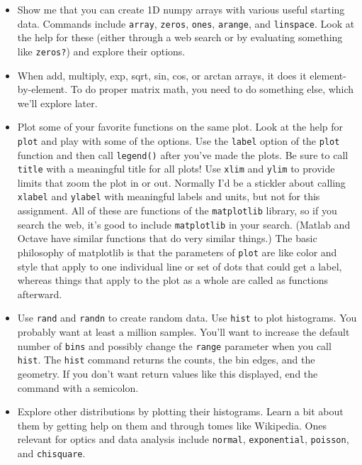 \documentclass[11pt]{hmcpset}
\begin{document}
\begin{problem}
	\begin{itemize}
		\item Show me that you can create 1D numpy arrays with various useful starting data. Commands include \texttt{array}, \texttt{zeros}, \texttt{ones}, \texttt{arange}, and \texttt{linspace}. Look at the help for these (either through a web search or by evaluating something like \texttt{zeros?}) and explore their options.
		\item When add, multiply, exp, sqrt, sin, cos, or arctan arrays, it does it element-by-element. To do proper matrix math, you need to do something else, which we'll explore later.
		\item Plot some of your favorite functions on the same plot. Look at the help for \texttt{plot} and play with some of the options. Use the \texttt{label} option of the \texttt{plot} function and then call \texttt{legend()} after you've made the plots. Be sure to call \texttt{title} with a meaningful title for all plots! Use \texttt{xlim} and \texttt{ylim} to provide limits that zoom the plot in or out. Normally I'd be a stickler about calling \texttt{xlabel} and \texttt{ylabel} with meaningful labels and units, but not for this assignment. All of these are functions of the \texttt{matplotlib} library, so if you search the web, it's good to include \texttt{matplotlib} in your search. (Matlab and Octave have similar functions that do very similar things.) The basic philosophy of matplotlib is that the parameters of \texttt{plot} are like color and style that apply to one individual line or set of dots that could get a label, whereas things that apply to the plot as a whole are called as functions afterward.
		\item Use \texttt{rand} and \texttt{randn} to create random data. Use \texttt{hist} to plot histograms. You probably want at least a million samples. You'll want to increase the default number of \texttt{bins} and possibly change the \texttt{range} parameter when you call \texttt{hist}. The \texttt{hist} command returns the counts, the bin edges, and the geometry. If you don't want return values like this displayed, end the command with a semicolon.
		\item Explore other distributions by plotting their histograms. Learn a bit about them by getting help on them and through tomes like Wikipedia. Ones relevant for optics and data analysis include \texttt{normal}, \texttt{exponential}, \texttt{poisson}, and \texttt{chisquare}.

\end{itemize}
\end{problem}
\end{document}
